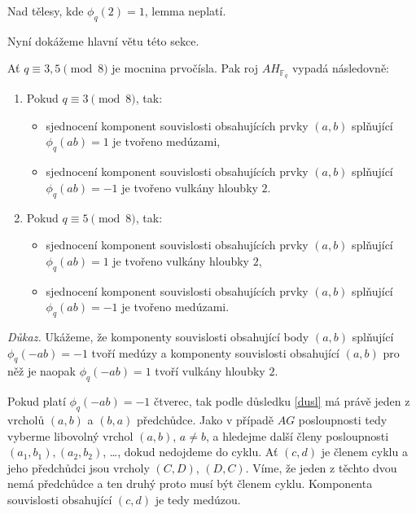 \documentclass[12pt]{report}
\begin{document}
\begin{poznamka}
Nad tělesy, kde $\phi_q(2) =1$, lemma neplatí.
\end{poznamka}

Nyní dokážeme hlavní větu této sekce.

\begin{veta}\label{big}
Ať $q \equiv 3,5 \pmod{8}$ je mocnina prvočísla. Pak roj $AH_{\mathbb{F}_q}$ vypadá následovně:
\begin{enumerate}
\item Pokud $q \equiv 3 \pmod{8}$, tak:
\begin{itemize}
\item sjednocení komponent souvislosti obsahujících prvky $(a,b)$ splňující $\phi_q(ab) = 1$ je tvořeno medúzami,
\item sjednocení komponent souvislosti obsahujících prvky $(a,b)$ splňující $\phi_q(ab) = -1$ je tvořeno vulkány hloubky $2$.
\end{itemize}
\item Pokud $q \equiv 5 \pmod{8}$, tak:
\begin{itemize}
\item sjednocení komponent souvislosti obsahujících prvky $(a,b)$ splňující $\phi_q(ab) = 1$ je tvořeno vulkány hloubky $2$,
\item sjednocení komponent souvislosti obsahujících prvky $(a,b)$ splňující $\phi_q(ab) = -1$ je tvořeno medúzami.
\end{itemize}
\end{enumerate}

\end{veta}

\noindent \textit{Důkaz.} Ukážeme, že komponenty souvislosti obsahující body $(a,b)$ splňující $\phi_q(-ab) = -1$ tvoří medúzy a komponenty souvislosti obsahující $(a,b)$ pro něž je naopak $\phi_q(-ab)=1$ tvoří vulkány hloubky $2$.


Pokud platí $\phi_q(-ab) =-1$ čtverec, tak podle důsledku \ref{dusl} má právě jeden z vrcholů $(a,b)$ a $(b,a)$ předchůdce. Jako v případě $AG$ posloupnosti tedy vyberme libovolný vrchol $(a,b)$, $a \neq b$, a hledejme další členy posloupnosti $(a_1,b_1), (a_2,b_2)$, \dots, dokud nedojdeme do cyklu. Ať $(c,d)$ je členem cyklu a jeho předchůdci jsou vrcholy $(C,D)$, $(D,C)$. Víme, že jeden z těchto dvou nemá předchůdce a ten druhý proto musí být členem cyklu. Komponenta souvislosti obsahující $(c,d)$ je tedy medúzou.
\end{document}
